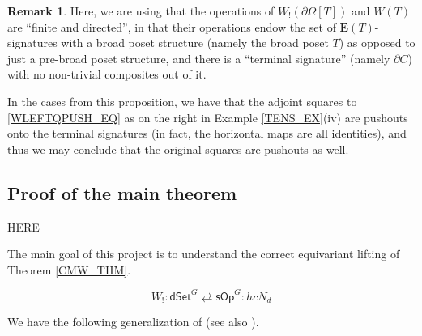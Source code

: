 \documentclass[a4paper,10pt
,draft
]{article}%
\numberwithin{equation}{section}
\numberwithin{figure}{section}
\theoremstyle{definition} %
\newtheorem{remark}[equation]{Remark}%
\newcommand{\set}[1]{\left\{#1\right\}}%
\newcommand{\vect}[1]{\text{\overrightharp{\ensuremath{#1}}}}
\newcommand{\sOp}{\ensuremath{\mathsf{sOp}}}%
\newcommand{\dSet}{\mathsf{dSet}}
\newcommand{\1}{\ensuremath{\mathbbm 1}}%
\begin{document}
\begin{remark}
      Here, we are using that the operations of $W_!(\partial\Omega[T])$ and $W(T)$ are ``finite and directed'',
      in that their operations endow the set of $\boldsymbol{E}(T)$-signatures with a broad poset structure (namely the broad poset $T$) as opposed to just a pre-broad poset structure,
      and there is a ``terminal signature'' (namely $\partial C$) with no non-trivial composites out of it.

      In the cases from this proposition, we have that
      the adjoint squares to \eqref{WLEFTQPUSH_EQ} as on the right in Example \ref{TENS_EX}(iv) are pushouts onto the terminal signatures
      (in fact, the horizontal maps are all identities),
      and thus we may conclude that the original squares are pushouts as well.
\end{remark}










\subsection{Proof of the main theorem}


{\color{red} HERE}


The main goal of this project \cite{BP_geo,BP_edss,Per18} is to understand the correct equivariant lifting of Theorem \ref{CMW_THM}.


	\begin{equation}\label{SOPDSETG_EQ}
		W_! \colon \dSet^G \rightleftarrows \sOp^G \colon hcN_d
	\end{equation}


We have the following generalization of \cite[Prop 4.5]{CM13b} (see also \cite[Prop. 6.15]{Per18}).
\end{document}
